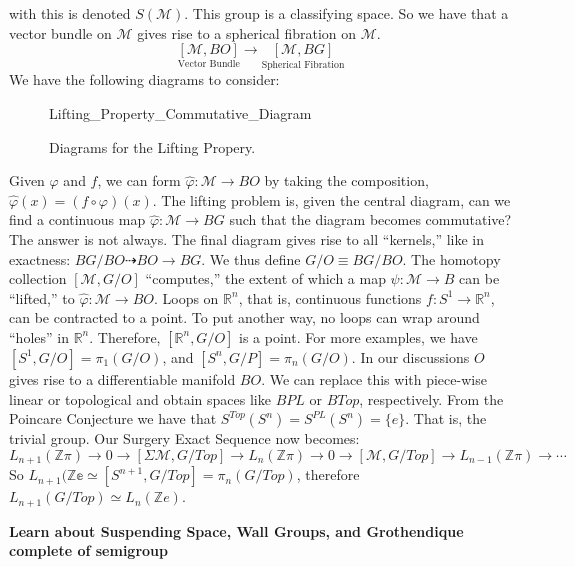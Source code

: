\documentclass[crop=false,class=article,oneside]{standalone}
\begin{document}
        with this is denoted $S(\mathcal{M})$. This group
        is a classifying space. So we have that a vector
        bundle on $\mathcal{M}$ gives rise to a spherical
        fibration on $\mathcal{M}$.
        \begin{equation*}
            \underset{\textrm{Vector Bundle}}{[\mathcal{M},BO]}
            \longrightarrow
            \underset{\textrm{Spherical Fibration}}{[\mathcal{M},BG]}
        \end{equation*}
        We have the following diagrams to consider:
        \begin{figure}
            \centering
            \captionsetup{type=figure}
            
                      {Lifting_Property_Commutative_Diagram}
            \caption{Diagrams for the Lifting Propery.}
            \label{fig:Surgery_Theory_Lifting_Property_Diagram}
        \end{figure}
        Given $\varphi$ and $f$, we can form
        $\hat{\varphi}:\mathcal{M}\rightarrow{BO}$ by taking
        the composition, $\hat{\varphi}(x)=(f\circ\varphi)(x)$.
        The lifting problem is, given the central diagram,
        can we find a continuous map
        $\hat{\varphi}:\mathcal{M}\rightarrow{BG}$ such that
        the diagram becomes commutative? The answer is not always.
        The final diagram gives rise to all ``kernels,'' like
        in exactness: $BG/BO\dashrightarrow{BO}\rightarrow{BG}$.
        We thus define $G/O\equiv{BG/BO}$. The homotopy collection
        $[\mathcal{M},G/O]$ ``computes,'' the extent of which a map
        $\psi:\mathcal{M}\rightarrow{B}$ can be ``lifted,'' to
        $\hat{\varphi}:\mathcal{M}\rightarrow{BO}$.
        Loops on $\mathbb{R}^{n}$, that is, continuous functions
        $f:S^{1}\rightarrow\mathbb{R}^{n}$, can be
        contracted to a point. To put another way, no loops
        can wrap around ``holes'' in $\mathbb{R}^{n}$.
        Therefore, $[\mathbb{R}^{n},G/O]$ is a point. For
        more examples, we have
        $[S^{1},G/O]=\pi_{1}(G/O)$, and
        $[S^{n},G/P]=\pi_{n}(G/O)$. In our discussions
        $O$ gives rise to a differentiable manifold $BO$.
        We can replace this with piece-wise linear or
        topological and obtain spaces like
        $BPL$ or $BTop$, respectively.
        From the Poincare Conjecture we have that
        $S^{Top}(S^{n})=S^{PL}(S^{n})=\{e\}$. That is,
        the trivial group. Our Surgery Exact Sequence now
        becomes:
        \begin{equation*}
            L_{n+1}(\mathbb{Z}\pi)\rightarrow
            0\rightarrow
            [\Sigma\mathcal{M},G/Top]\rightarrow
            L_{n}(\mathbb{Z}\pi)\rightarrow
            0\rightarrow
            [\mathcal{M},G/Top]\rightarrow
            L_{n-1}(\mathbb{Z}\pi)\rightarrow\cdots
        \end{equation*}
        So $L_{n+1}(\mathbb{Ze}\simeq[S^{n+1},G/Top]%
            =\pi_{n}(G/Top)$,
        therefore $L_{n+1}(G/Top)\simeq{L_{n}(\mathbb{Z}e)}$.
        \par\hfill\par
        \textbf{Learn about Suspending Space, Wall Groups,
                and Grothendique complete of semigroup}
\end{document}
